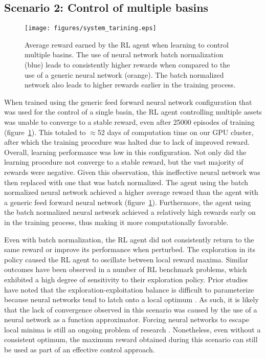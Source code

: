 \subsection{\textbf{Scenario 2: Control of multiple basins}}

\begin{figure}[H]
    \centering
    \texttt{[image: figures/system\_tarining.eps]}
    \caption{Average reward earned by the RL agent when learning to control multiple basins. The use of neural network batch normalization (blue) leads to consistently higher rewards when compared to the use of a generic neural network (orange).  The batch normalized network also leads to higher rewards earlier in the training process.}
    \label{fig:4}
\end{figure}


When trained using the generic feed forward neural network configuration that was used for the control of a single basin, the RL agent controlling multiple assets was unable to converge to a stable reward, even after 25000 episodes of training (figure~\ref{fig:4}).
This totaled to $\approx$52 days of computation time on our GPU cluster, after which the training procedure was halted due to lack of improved reward.
Overall, learning performance was low in this configuration.
Not only did the learning procedure not converge to a stable reward, but the vast majority of rewards were negative.
Given this observation, this ineffective neural network was then replaced with one that was batch normalized.
The agent using the batch normalized neural network achieved a higher average reward than the agent with a generic feed forward neural network (figure~\ref{fig:4}).
Furthermore, the agent using the batch normalized neural network achieved a relatively high rewards early on in the training process, thus making it more computationally favorable.

Even with batch normalization, the RL agent did not consistently return to the same reward or improve its performance when perturbed.
The exploration in its policy caused the RL agent to oscillate between local reward maxima.
Similar outcomes have been observed in a number of RL benchmark problems\cite{henderson2017Deep, Mnih2015}, which exhibited a high degree of sensitivity to their exploration policy.
Prior studies have noted that the exploration-exploitation balance is difficult to parameterize because neural networks tend to latch onto a local optimum \cite{larochelle2009exploring}.
As such, it is likely that the lack of convergence observed in this scenario was caused by the use of a neural network as a function approximator.
Forcing neural networks to escape local minima is still an ongoing problem of research \cite{osband2016Deep}.
Nonetheless, even without a consistent optimum, the maximum reward obtained during this scenario can still be used as part of an effective control approach.


